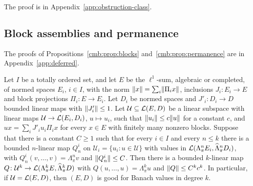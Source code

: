 The proof is in Appendix~\ref{app:obstruction-class}.

\subsection{Block assemblies and permanence}\label{cmb:ssec:blocks}\label{cmb:ssec:permanence}

The proofs of Propositions~\ref{cmb:prop:blocks} and~\ref{cmb:prop:permanence} are in Appendix~\ref{app:deferred}.

\begin{proposition}\label{cmb:prop:blocks}
Let $I$ be a totally ordered set, and let $E$ be the $\ell^1$-sum, algebraic or completed, of normed spaces $E_i$,
$i\in I$, with the norm $\lVert x\rVert=\sum_i\lVert \Pi_ix\rVert$, inclusions $J_i\colon E_i\to E$ and block projections
$\Pi_i\colon E\to E_i$. Let $D_i$ be normed spaces and $J'_i\colon D_i\to D$ bounded linear maps with $\lVert J'_i\rVert\le1$.
Let $\mathcal U\subseteq\mathcal L(E,D)$ be a linear subspace with linear maps $\mathcal U\to\mathcal L(E_i,D_i)$, $u\mapsto u_i$, such
that $\lVert u_i\rVert\le c\lVert u\rVert$ for a constant $c$, and $ux=\sum_iJ'_iu_i\Pi_ix$ for every $x\in E$ with finitely many
nonzero blocks. Suppose that there is a constant $C\ge1$ such that for every $i\in I$ and every $n\le k$ there is a
bounded $n$-linear map $Q^i_n$ on $\mathcal U_i=\{u_i:u\in\mathcal U\}$ with values in
$\mathcal L(\Lambda^n_\pi E_i,\widehat\Lambda^n_\pi D_i)$, with $Q^i_n(v,\dots,v)=\Lambda^n_\pi v$ and $\lVert Q^i_n\rVert\le C$. Then
there is a bounded $k$-linear map $Q\colon\mathcal U^k\to\mathcal L(\Lambda^k_\pi E,\widehat\Lambda^k_\pi D)$ with
$Q(u,\dots,u)=\Lambda^k_\pi u$ and $\lVert Q\rVert\le C^kc^k$. In particular, if $\mathcal U=\mathcal L(E,D)$, then $(E,D)$ is good for
Banach values in degree $k$.
\end{proposition}

